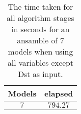 \begin{table}[!ht]
	\centering
	\begin{tabular}{|c|c|}
		\hline
		Models & elapsed \\ \hline
		$7$ & $794.27$ \\ \hline
	\end{tabular}
	\caption{The time taken for all algorithm stages in seconds for an ansamble of 7 models when using all variables except Dst as input.}
	\label{tab:time:ansamble:noDst:7}
\end{table}
